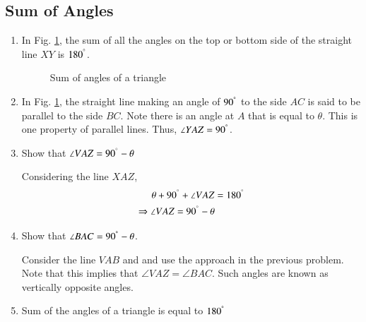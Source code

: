\subsection{Sum of Angles}
\renewcommand{\theequation}{\theenumi}
\begin{enumerate}[label=\arabic*.,ref=\thesubsection.\theenumi]
\item 	In Fig. \ref{ch1_parallel_triangle}, the sum of all the angles on the top or bottom side of the straight line $XY$ is $180^{\degree}$.


\begin{figure}[!ht]
	\begin{center}
		\resizebox{\columnwidth}{!}{}
	\end{center}
	\caption{Sum of angles of a triangle}
	\label{ch1_parallel_triangle}	
\end{figure}



\item
In Fig. \ref{ch1_parallel_triangle}, the straight line making an angle of $90^{\degree}$ to the side $AC$ is said to be parallel to the side $BC$. Note there is an angle at $A$ that is equal to $\theta$.  This is one property of parallel lines.  Thus, $\angle YAZ = 90^{\degree}$.


\item
	Show that $\angle VAZ = 90^{\degree} - \theta$
		
	\solution Considering the line $XAZ$,
	\begin{align}
	\theta + 90^{\degree} + \angle VAZ &= 180^{\degree} \\
	\Rightarrow  \angle VAZ =  90^{\degree} - \theta
	\end{align}

\item
	\label{ch1_compl_angle}
	Show that $\angle BAC = 90^{\degree} - \theta$.
	
	\solution Consider the line $VAB$ and and use the approach in the previous problem.  Note that this implies that $\angle VAZ = \angle BAC$.  Such angles are known as vertically opposite angles. 
	 
\item
Sum of the angles of a triangle is equal to $180^{\degree}$
\end{enumerate}
